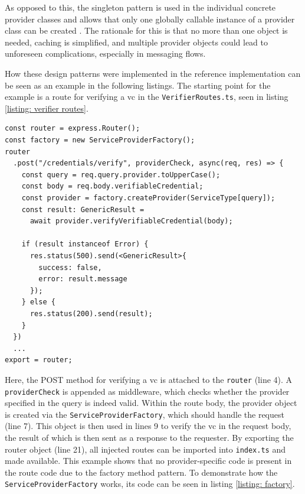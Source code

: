     As opposed to this, the singleton pattern is used in the individual concrete provider classes and allows that only one globally callable instance of a provider class can be created \cite[p. 127]{gamma_design_1995}. The rationale for this is that no more than one object is needed, caching is simplified, and multiple provider objects could lead to unforeseen complications, especially in messaging flows. 
    
    How these design patterns were implemented in the reference implementation can be seen as an example in the following listings. The starting point for the example is a route for verifying a \ac{vc} in the \texttt{VerifierRoutes.ts}, seen in listing \ref{listing: verifier routes}.
    \newline

    \begin{lstlisting}[style=ES6, caption=Extract of verifier routes, label={listing: verifier routes}]
const router = express.Router();
const factory = new ServiceProviderFactory();
router
  .post("/credentials/verify", providerCheck, async(req, res) => {
    const query = req.query.provider.toUpperCase();
    const body = req.body.verifiableCredential;
    const provider = factory.createProvider(ServiceType[query]);
    const result: GenericResult =
      await provider.verifyVerifiableCredential(body);
      
    if (result instanceof Error) {
      res.status(500).send(<GenericResult>{ 
        success: false, 
        error: result.message 
      });
    } else {
      res.status(200).send(result);
    }
  })
  ...
export = router;
\end{lstlisting}

    Here, the POST method for verifying a \ac{vc} is attached to the \texttt{router} (line 4). A \texttt{providerCheck} is appended as middleware, which checks whether the provider specified in the query is indeed valid. Within the route body, the provider object is created via the \texttt{ServiceProviderFactory}, which should handle the request (line 7). This object is then used in lines 9 to verify the \ac{vc} in the request body, the result of which is then sent as a response to the requester. By exporting the router object (line 21), all injected routes can be imported into \texttt{index.ts} and made available. This example shows that no provider-specific code is present in the route code due to the factory method pattern. To demonstrate how the \texttt{ServiceProviderFactory} works, its code can be seen in listing \ref{listing: factory}.
    \newline
    
